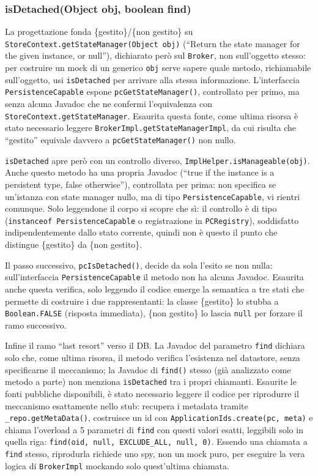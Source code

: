 \subsubsection{isDetached(Object obj, boolean find)}

La progettazione fonda \{gestito\}/\{non gestito\} su
\texttt{StoreContext.getStateManager(Object obj)} (``Return the state manager for the given
instance, or null''), dichiarato però sul \texttt{Broker}, non sull'oggetto stesso: per costruire
un mock di un generico \texttt{obj} serve sapere quale metodo, richiamabile sull'oggetto, usi
\texttt{isDetached} per arrivare alla stessa informazione. L'interfaccia
\texttt{PersistenceCapable} espone
\texttt{pcGetStateManager()}, controllato per primo, ma senza alcuna Javadoc che ne confermi
l'equivalenza con \texttt{StoreContext.getStateManager}. Esaurita questa fonte, come ultima
risorsa è stato necessario leggere \texttt{BrokerImpl.getStateManagerImpl}, da cui risulta che ``gestito'' equivale
davvero a \texttt{pcGetStateManager()} non nullo.

\texttt{isDetached} apre però con un controllo diverso, \texttt{ImplHelper.isManageable(obj)}.
Anche questo metodo ha una propria Javadoc (``true if the instance is a persistent type, false
otherwise''), controllata per prima: non specifica se un'istanza con state manager nullo, ma di
tipo \texttt{PersistenceCapable}, vi rientri comunque. Solo leggendone il corpo si scopre che sì: il controllo è di tipo (\texttt{instanceof PersistenceCapable} o
registrazione in \texttt{PCRegistry}), soddisfatto indipendentemente dallo stato corrente, quindi
non è questo il punto che distingue \{gestito\} da \{non gestito\}.

Il passo successivo, \texttt{pcIsDetached()}, decide da sola l'esito se non nulla: sull'interfaccia
\texttt{PersistenceCapable} il metodo non ha alcuna Javadoc. Esaurita anche questa verifica, solo leggendo il codice emerge
la semantica a tre stati che permette di costruire i due rappresentanti: la classe \{gestito\} lo
stubba a \texttt{Boolean.FALSE} (risposta immediata), \{non gestito\} lo lascia \texttt{null} per
forzare il ramo successivo.

Infine il ramo ``last resort'' verso il DB. La Javadoc del parametro \texttt{find} dichiara solo
che, come ultima risorsa, il metodo verifica l'esistenza nel datastore, senza specificarne il
meccanismo; la Javadoc di \texttt{find()} stesso (già analizzato come metodo a parte) non
menziona \texttt{isDetached} tra i propri chiamanti. Esaurite le fonti pubbliche disponibili, è
stato necessario leggere il codice per riprodurre il meccanismo esattamente nello stub: recupera
i metadata tramite \texttt{\_repo.getMetaData()}, costruisce un id con
\texttt{ApplicationIds.create(pc, meta)} e chiama l'overload a 5 parametri di \texttt{find} con
questi valori esatti, leggibili solo in quella riga: \texttt{find(oid, null, EXCLUDE\_ALL, null,
0)}. Essendo una chiamata a \texttt{find} stesso, riprodurla richiede uno spy, non un mock puro,
per eseguire la vera logica di \texttt{BrokerImpl} mockando solo quest'ultima chiamata.

